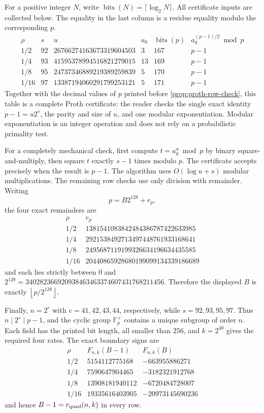 \documentclass[11pt,a4paper]{amsart}
\numberwithin{equation}{section}
\theoremstyle{remark}
\newcommand{\F}{\mathbb F}
\newcommand{\floor}[1]{\left\lfloor #1\right\rfloor}
\begin{document}
For a positive integer \(N\), write
\(\operatorname{bits}(N)=\lceil\log_2N\rceil\).  All certificate inputs
are collected below.  The equality in the last
column is a residue equality modulo the corresponding \(p\).
\[
\begin{array}{c|r|r|r|r|r}
 \rho&s&u&a_0&\operatorname{bits}(p)&
 a_0^{(p-1)/2}\bmod p\\ \hline
 1/2&92&26766274163673319604503&3&167&p-1\\
 1/4&93&41595378994516821279015&13&169&p-1\\
 1/8&95&24737346889219389259839&5&170&p-1\\
 1/16&97&13387194060291799253121&5&171&p-1
\end{array}
\]
Together with the decimal values of \(p\) printed before
\cref{prop:proth-row-check}, this table is a complete Proth certificate:
the reader checks the single exact identity \(p-1=u2^s\), the parity and
size of \(u\), and one modular exponentiation.  Modular exponentiation is
an integer operation and does not rely on a probabilistic primality test.

For a completely mechanical check, first compute
\(t=a_0^u\bmod p\) by binary square-and-multiply, then square \(t\)
exactly \(s-1\) times modulo \(p\).  The certificate accepts precisely
when the result is \(p-1\).  The algorithm uses
\(O(\log u+s)\) modular multiplications.  The remaining row checks use
only division with remainder.  Writing
\[
                         p=B2^{128}+r_p,
\]
the four exact remainders are
\[
\begin{array}{c|r}
 \rho&r_p\\ \hline
 1/2&1381541083842484386787422633985\\
 1/4&2921538492713497448761933168641\\
 1/8&2495687119199326634196634435585\\
 1/16&20440865928680199099134339186689
\end{array}
\]
and each lies strictly between \(0\) and
\(2^{128}=340282366920938463463374607431768211456\).  Therefore the
displayed \(B\) is exactly \(\floor{p/2^{128}}\).

Finally, \(n=2^e\) with \(e=41,42,43,44\), respectively, while
\(s=92,93,95,97\).  Thus \(n\mid2^s\mid p-1\), and the cyclic group
\(\F_p^\times\) contains a unique subgroup of order \(n\).  Each field
has the printed bit length, all smaller than \(256\), and
\(k=2^{40}\) gives the required four rates.  The exact boundary signs are
\[
\begin{array}{c|r|r}
 \rho&F_{n,k}(B-1)&F_{n,k}(B)\\ \hline
 1/2&5154112775168&-663955886271\\
 1/4&7590647904465&-3182321912768\\
 1/8&13908181940112&-6720484728007\\
 1/16&19335616403905&-20973145690236
\end{array}
\]
and hence \(B-1=r_{\rm quad}(n,k)\) in every row.
\end{document}
